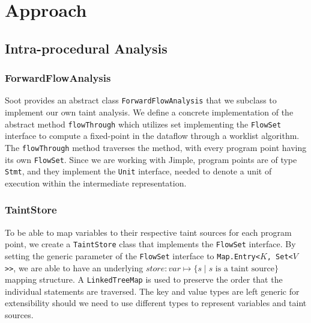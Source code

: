 \documentclass[acmsmall]{acmart}
\begin{document}
\section{Approach}
\subsection{Intra-procedural Analysis}
\subsubsection{ForwardFlowAnalysis} Soot provides an abstract class \texttt{ForwardFlowAnalysis} that we subclass to implement our own taint analysis. We define a concrete implementation of the abstract method \texttt{flowThrough} which utilizes set implementing the \texttt{FlowSet} interface to compute a fixed-point in the dataflow through a worklist algorithm. The \texttt{flowThrough} method traverses the method, with every program point having its own \texttt{FlowSet}. Since we are working with Jimple, program points are of type \texttt{Stmt}, and they implement the \texttt{Unit} interface, needed to denote a unit of execution within the intermediate representation.

\subsubsection{TaintStore} To be able to map variables to their respective taint sources for each program point, we create a \texttt{TaintStore} class that implements the \texttt{FlowSet} interface. By setting the generic parameter of the \texttt{FlowSet} interface to \texttt{Map.Entry<$K$, Set<$V$>{}>}, we are able to have an underlying $store:var \mapsto \{s \mid s \text{ is a taint source}\}$ mapping structure. A \texttt{LinkedTreeMap} is used to preserve the order that the individual statements are traversed. The key and value types are left generic for extensibility should we need to use different types to represent variables and taint sources. 
\end{document}
